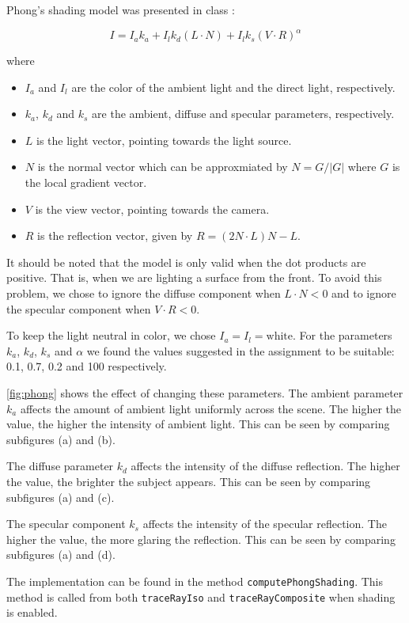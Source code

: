 \documentclass[a4paper]{article}
\begin{document}
Phong's shading model was presented in class \citep{2imv20_2}:

$$I = I_a k_a + I_l k_d(L \cdot N) + I_l k_s(V \cdot R)^\alpha$$

\noindent where

\begin{itemize}
  \item $I_a$ and $I_l$ are the color of the ambient light and the direct light, respectively.
  \item $k_a$, $k_d$ and $k_s$ are the ambient, diffuse and specular parameters, respectively.
  \item $L$ is the light vector, pointing towards the light source.
  \item $N$ is the normal vector which can be approxmiated by $N = {G}/{|G|}$ where $G$ is the local gradient vector.
  \item $V$ is the view vector, pointing towards the camera.
  \item $R$ is the reflection vector, given by $R = (2N \cdot L)N-L$.
\end{itemize}

\noindent It should be noted that the model is only valid when the dot products are positive. That is, when we are lighting a surface from the front. To avoid this problem, we chose to ignore the diffuse component when $L \cdot N < 0$ and to ignore the specular component when $V \cdot R < 0$.

To keep the light neutral in color, we chose $I_a = I_l = \text{white}$. For the parameters $k_a$, $k_d$, $k_s$ and $\alpha$ we found the values suggested in the assignment to be suitable: 0.1, 0.7, 0.2 and 100 respectively.

\autoref{fig:phong} shows the effect of changing these parameters. The ambient parameter $k_a$ affects the amount of ambient light uniformly across the scene. The higher the value, the higher the intensity of ambient light. This can be seen by comparing subfigures (a) and (b).

The diffuse parameter $k_d$ affects the intensity of the diffuse reflection. The higher the value, the brighter the subject appears. This can be seen by comparing subfigures (a) and (c).

The specular component $k_s$ affects the intensity of the specular reflection. The higher the value, the more glaring the reflection. This can be seen by comparing subfigures (a) and (d).

The implementation can be found in the method {\tt computePhongShading}. This method is called from both {\tt traceRayIso} and {\tt traceRayComposite} when shading is enabled.
\end{document}
